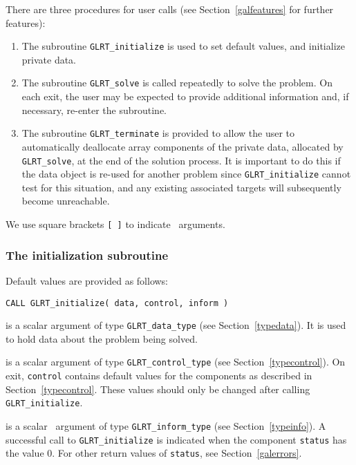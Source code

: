 \documentclass{galahad}
\newcommand{\packagename}{GL\-RT}
\begin{document}

\galarguments
There are three procedures for user calls
(see Section~\ref{galfeatures} for further features):

\begin{enumerate}
\item The subroutine
      {\tt \packagename\_initialize}
      is used to set default values, and initialize private data.
\item The subroutine
      {\tt \packagename\_solve}
      is called repeatedly to solve the problem.
      On each exit, the user may be expected to provide additional
      information and, if necessary, re-enter the subroutine.
\item The subroutine
      {\tt \packagename\_terminate}
      is provided to allow the user to automatically deallocate array
       components of the private data, allocated by
       {\tt \packagename\_solve},
       at the end of the solution process.
       It is important to do this if the data object is re-used for another
       problem since {\tt \packagename\_initialize} cannot test for this
       situation,
       and any existing associated targets will subsequently become
       unreachable.
\end{enumerate}
We use square brackets {\tt [ ]} to indicate \optional\ arguments.


\subsubsection{The initialization subroutine}\label{subinit}
 Default values are provided as follows:

\hskip0.5in
{\tt CALL \packagename\_initialize( data, control, inform )}

\begin{description}

 is a scalar \intentinout argument of type
{\tt \packagename\_data\_type}
(see Section~\ref{typedata}). It is used to hold data about the problem being
solved.

 is a scalar \intentout argument of type
{\tt \packagename\_control\_type}
(see Section~\ref{typecontrol}).
On exit, {\tt control} contains default values for the components as
described in Section~\ref{typecontrol}.
These values should only be changed after calling
{\tt \packagename\_initialize}.

 is a scalar \intentout\ argument of type
{\tt \packagename\_inform\_type}
(see Section~\ref{typeinfo}). A successful call to
{\tt \packagename\_initialize}
is indicated when the  component {\tt status} has the value 0.
For other return values of {\tt status}, see Section~\ref{galerrors}.

\end{description}
\end{document}
